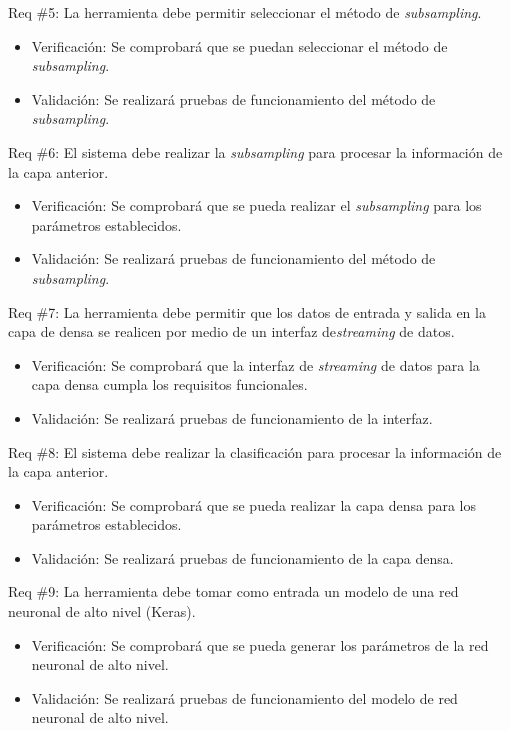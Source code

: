 \documentclass[11pt]{charter}
\begin{document}
Req \#5: La herramienta debe permitir seleccionar el método de \textit{subsampling}.

\begin{itemize}
\item Verificación: Se comprobará que se puedan seleccionar el método de \textit{subsampling}. 
\item Validación: Se realizará pruebas de funcionamiento del método de \textit{subsampling}.  
\end{itemize}

Req \#6: El sistema debe realizar la \textit{subsampling} para procesar la información de la capa anterior.

\begin{itemize}
\item Verificación: Se comprobará que se pueda realizar el \textit{subsampling} para los parámetros establecidos. 
\item Validación: Se realizará pruebas de funcionamiento del método de \textit{subsampling}.  
\end{itemize}

Req \#7: La herramienta debe permitir que los datos de entrada y salida en la capa de densa se realicen por medio de un interfaz de\textit{streaming} de datos.

\begin{itemize}
\item Verificación: Se comprobará que la interfaz de \textit{streaming} de datos para la capa densa cumpla los requisitos funcionales. 
\item Validación: Se realizará pruebas de funcionamiento de la interfaz.  
\end{itemize}

Req \#8: El sistema debe realizar la clasificación para procesar la información de la capa anterior.

\begin{itemize}
\item Verificación: Se comprobará que se pueda realizar la capa densa para los parámetros establecidos. 
\item Validación: Se realizará pruebas de funcionamiento de la capa densa.  
\end{itemize}

Req \#9: La herramienta debe tomar como entrada un modelo de una red neuronal de alto nivel (Keras).

\begin{itemize}
\item Verificación: Se comprobará que se pueda generar los parámetros de la red neuronal de alto nivel. 
\item Validación: Se realizará pruebas de funcionamiento del modelo de red neuronal de alto nivel.  
\end{itemize}
\end{document}
